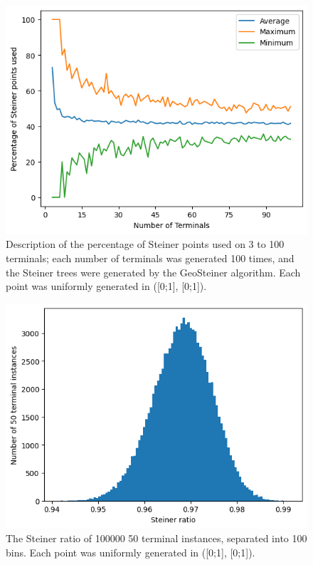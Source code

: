 \documentclass{mpaper}
\begin{document}
\begin{figure}
  \begin{center}
  \includegraphics[scale=0.5]{plot1.png}
  \end{center}
  \caption{\label{fig:2}Description of the percentage of Steiner points used on 3 to 100 terminals; each number of terminals was generated 100 times, and the Steiner trees were generated by the GeoSteiner algorithm. Each point was uniformly generated in ([0;1], [0;1]). }
\end{figure}

\begin{figure}
  \begin{center}
  \includegraphics[scale=0.5]{plot5.png}
  \end{center}
  \caption{\label{fig:5} The Steiner ratio of 100000 50 terminal instances, separated into 100 bins. Each point was uniformly generated in ([0;1], [0;1]).}
\end{figure}
\end{document}
